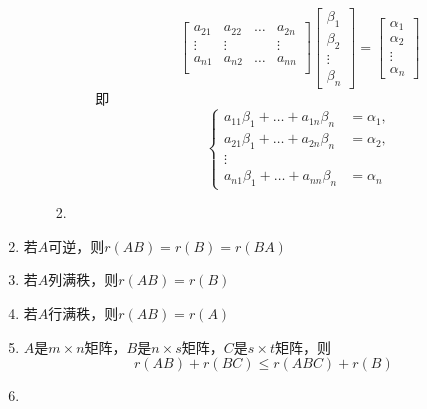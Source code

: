 \documentclass[a4paper,12pt]{article}
\begin{document}
\begin{enumerate}
\begin{enumerate}
\begin{enumerate}
\begin{itemize}
\[\begin{bmatrix}
                            a_{21} & a_{22} & \dots & a_{2n} \\
                            \vdots & \vdots &       & \vdots \\
                            a_{n1} & a_{n2} & \dots & a_{nn} \\
                        \end{bmatrix}
                        \begin{bmatrix}
                            \beta_1 \\ \beta_2 \\ \vdots \\ \beta_n
                        \end{bmatrix}
                        =
                        \begin{bmatrix}
                            \alpha_1 \\ \alpha_2 \\ \vdots \\ \alpha_n
                        \end{bmatrix}
                    \]
                    即
                    \[
                        \begin{cases}
                            a_{11}\beta_1 + \dots + a_{1n}\beta_n &= \alpha_1, \\
                            a_{21}\beta_1 + \dots + a_{2n}\beta_n &= \alpha_2, \\
                            \vdots & \\
                            a_{n1}\beta_1 + \dots + a_{nn}\beta_n &= \alpha_n
                        \end{cases}
                    \]
                \end{itemize}
                \item {\color[rgb]{0.2, 0.6, 0.3}{矩阵$C(AB)$的列向量可由$A$的列向量线性表出}}
            \end{enumerate}
        \end{enumerate}
        \item 若$A$可逆，则$r(AB) = r(B) = r(BA)$
        \item 若$A$列满秩，则$r(AB) = r(B)$
        \item 若$A$行满秩，则$r(AB) = r(A)$
        \item $A$是$m \times n$矩阵，$B$是$n \times s$矩阵，$C$是$s \times t$矩阵，则
        \[
            r(AB) + r(BC) \le r(ABC) + r(B)
        \]
        \item

\end{enumerate}
\end{document}
